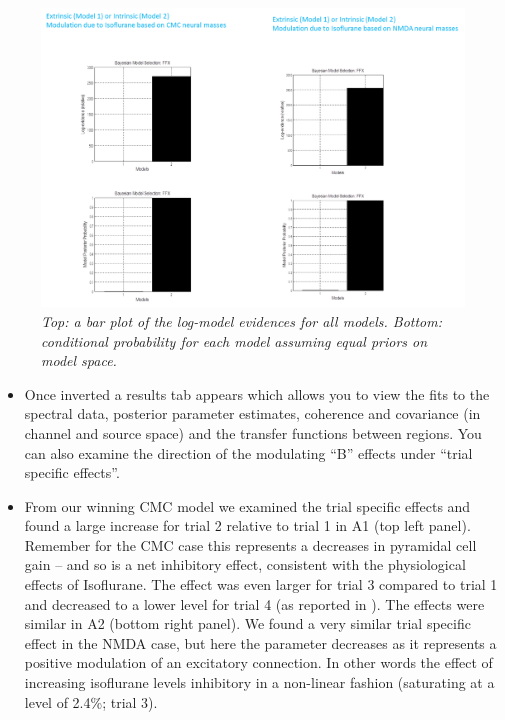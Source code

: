 \begin{figure}
\begin{center}
\includegraphics[width=140mm]{dcm_csd/dcm_csd_fig3}
\caption{\em  Top: a bar plot of the log-model evidences for all models. Bottom: conditional probability for each model assuming equal priors on model space. \label{dcm_ssr:fig3}}
\end{center}
\end{figure}

\begin{itemize}
\item Once inverted a results tab appears which allows you to view the fits to the spectral data, posterior parameter estimates, coherence and covariance (in channel and source space) and the transfer functions between regions. You can also examine the direction of the modulating “B” effects under “trial specific effects”.
\item From our winning CMC model we examined the trial specific effects and found a large increase for trial 2 relative to trial 1 in A1 (top left panel). Remember for the CMC case this represents a decreases in pyramidal cell gain – and so is a net inhibitory effect, consistent with the physiological effects of Isoflurane. The effect was even larger for trial 3 compared to trial 1 and decreased to a lower level for trial 4 (as reported in \cite{rm_massmodelspectral}). The effects were similar in A2 (bottom right panel). We found a very similar trial specific effect in the NMDA case, but here the parameter decreases as it represents a positive modulation of an excitatory connection. In other words the effect of increasing isoflurane levels inhibitory in a non-linear fashion (saturating at a level of 2.4\%; trial 3).
\end{itemize}

